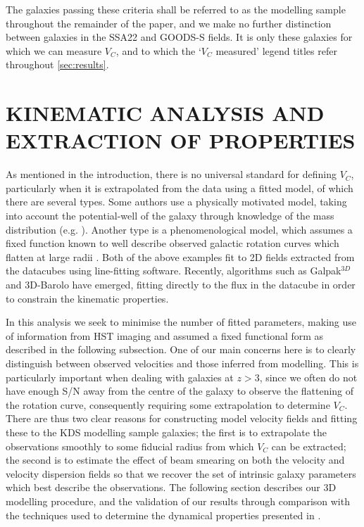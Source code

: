 \documentclass[fleqn,usenatbib]{mn2e}
\begin{document}
The galaxies passing these criteria shall be referred to as the modelling sample throughout the remainder of the paper, and we make no further distinction between galaxies in the SSA22 and GOODS-S fields.
It is only these galaxies for which we can measure $V_{C}$, and to which the `$V_{C}$ measured' legend titles refer throughout \ref{sec:results}.

\section{KINEMATIC ANALYSIS AND EXTRACTION OF PROPERTIES}\label{sec:Kinematic_Properties}
As mentioned in the introduction, there is no universal standard for defining $V_{C}$, particularly when it is extrapolated from the data using a fitted model, of which there are several types.
Some authors use a physically motivated model, taking into account the potential-well of the galaxy through knowledge of the mass distribution (e.g. \cite{Genzel2008,ForsterSchreiber2009,Gnerucci2011,Wisnioski2015}).
Another type is a phenomenological model, which assumes a fixed function known to well describe observed galactic rotation curves which flatten at large radii \citep[e.g.][]{Epinat2010,Epinat2012,Swinbank2012,Stott2016}.
Both of the above examples fit to 2D fields extracted from the datacubes using line-fitting software.
Recently, algorithms such as Galpak$^{3D}$ \citep{Bouche2015} and 3D-Barolo \citep{DiTeodoro2015} have emerged, fitting directly to the flux in the datacube in order to constrain the kinematic properties.

In this analysis we seek to minimise the number of fitted parameters, making use of information from HST imaging and assumed a fixed functional form as described in the following subsection.    
One of our main concerns here is to clearly distinguish between observed velocities and those inferred from modelling.
This is particularly important when dealing with galaxies at $z > 3$, since we often do not have enough S/N away from the centre of the galaxy to observe the flattening of the rotation curve, consequently requiring some extrapolation to determine $V_{C}$.  
There are thus two clear reasons for constructing model velocity fields and fitting these to the KDS modelling sample galaxies; the first is to extrapolate the observations smoothly to some fiducial radius from which $V_{C}$ can be extracted; the second is to estimate the effect of beam smearing on both the velocity and velocity dispersion fields so that we recover the set of intrinsic galaxy parameters which best describe the observations.
The following section describes our 3D modelling procedure, and the validation of our results through comparison with the techniques used to determine the dynamical properties presented in \cite{Harrison2017}. 
\end{document}
